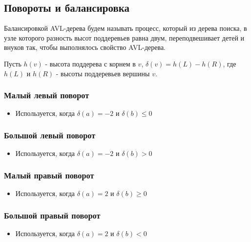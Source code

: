 \subsection{Повороты и балансировка}

\Def Балансировкой AVL-дерева будем называть процесс, который из
дерева поиска, в узле которого разность высот поддеревьев равна
двум, переподвешивает детей и внуков так, чтобы выполнялось
свойство AVL-дерева.

Пусть $h(v)$ - высота поддерева с корнем в $v$, $\delta(v) = h(L) - h(R)$, где $h(L)$ и $h(R)$ - высоты поддеревьев вершины $v$. 

\subsubsection*{Малый левый поворот}

\begin{itemize}
    \item Используется, когда $\delta(a) = -2$ и $\delta(b) \leq 0$
\end{itemize}

\subsubsection*{Большой левый поворот}

\begin{itemize}
    \item Используется, когда $\delta(a) = -2$ и $\delta(b) > 0$
\end{itemize}

\subsubsection*{Малый правый поворот}

\begin{itemize}
    \item Используется, когда $\delta(a) = 2$ и $\delta(b) \geq 0$
\end{itemize}

\subsubsection*{Большой правый поворот}

\begin{itemize}
    \item Используется, когда $\delta(a) = 2$ и $\delta(b) < 0$
\end{itemize}

